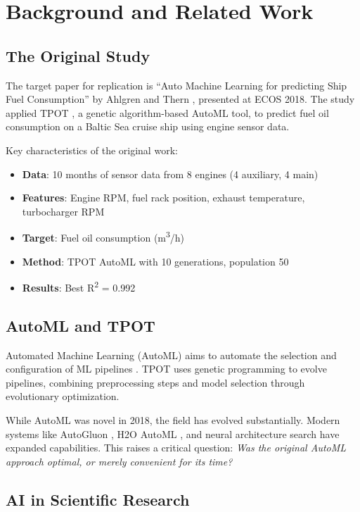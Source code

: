 \documentclass[conference]{IEEEtran}
\begin{document}
\section{Background and Related Work}

\subsection{The Original Study}

The target paper for replication is ``Auto Machine Learning for predicting Ship Fuel Consumption'' by Ahlgren and Thern \cite{ahlgren2018automl}, presented at ECOS 2018. The study applied TPOT \cite{olson2016tpot}, a genetic algorithm-based AutoML tool, to predict fuel oil consumption on a Baltic Sea cruise ship using engine sensor data.

Key characteristics of the original work:
\begin{itemize}
    \item \textbf{Data}: 10 months of sensor data from 8 engines (4 auxiliary, 4 main)
    \item \textbf{Features}: Engine RPM, fuel rack position, exhaust temperature, turbocharger RPM
    \item \textbf{Target}: Fuel oil consumption (m\textsuperscript{3}/h)
    \item \textbf{Method}: TPOT AutoML with 10 generations, population 50
    \item \textbf{Results}: Best R\textsuperscript{2} = 0.992
\end{itemize}

\subsection{AutoML and TPOT}

Automated Machine Learning (AutoML) aims to automate the selection and configuration of ML pipelines \cite{hutter2019automated}. TPOT \cite{olson2016tpot} uses genetic programming to evolve pipelines, combining preprocessing steps and model selection through evolutionary optimization.

While AutoML was novel in 2018, the field has evolved substantially. Modern systems like AutoGluon \cite{erickson2020autogluon}, H2O AutoML \cite{ledell2020h2o}, and neural architecture search have expanded capabilities. This raises a critical question: \textit{Was the original AutoML approach optimal, or merely convenient for its time?}

\subsection{AI in Scientific Research}
\end{document}
